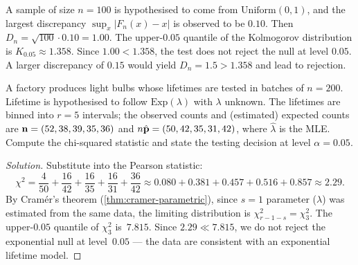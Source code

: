 \begin{example}
\label{ex:ks-uniform}
A sample of size $n = 100$ is hypothesised to come from
$\mathrm{Uniform}(0, 1)$, and the largest discrepancy
$\sup_x |F_n(x) - x|$ is observed to be $0.10$. Then
$D_n = \sqrt{100} \cdot 0.10 = 1.00$. The upper-$0.05$ quantile of
the Kolmogorov distribution is $K_{0.05} \approx 1.358$. Since
$1.00 < 1.358$, the test does not reject the null at level $0.05$.
A larger discrepancy of $0.15$ would yield $D_n = 1.5 > 1.358$ and
lead to rejection.
\end{example}

\begin{problem}
\label{prob:cramer-parametric-poisson}
A factory produces light bulbs whose lifetimes are tested in
batches of $n = 200$. Lifetime is hypothesised to follow
$\mathrm{Exp}(\lambda)$ with $\lambda$ unknown. The lifetimes are
binned into $r = 5$ intervals; the observed counts and (estimated)
expected counts are
$\mathbf{n} = (52, 38, 39, 35, 36)$ and
$n \hat{\mathbf{p}} = (50, 42, 35, 31, 42)$, where
$\hat \lambda$ is the MLE. Compute the chi-squared statistic and
state the testing decision at level $\alpha = 0.05$.
\end{problem}

\begin{proof}[Solution]
Substitute into the Pearson statistic:
\[
  \chi^2 = \frac{4}{50} + \frac{16}{42} + \frac{16}{35} + \frac{16}{31} + \frac{36}{42} \approx 0.080 + 0.381 + 0.457 + 0.516 + 0.857 \approx 2.29.
\]
By Cramér's theorem (\cref{thm:cramer-parametric}), since $s = 1$
parameter ($\lambda$) was estimated from the same data, the
limiting distribution is $\chi^2_{r - 1 - s} = \chi^2_3$. The
upper-$0.05$ quantile of $\chi^2_3$ is~$7.815$. Since
$2.29 \ll 7.815$, we do not reject the exponential null at
level~$0.05$ — the data are consistent with an exponential lifetime
model.
\end{proof}
